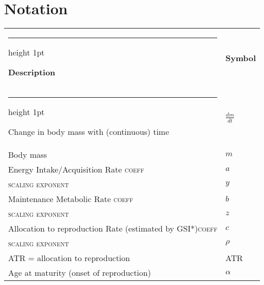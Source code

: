 \documentclass[a4paper]{article} %
\makeatletter
\newcommand{\thickhline}{%
    \noalign {\ifnum 0=`}\fi \hrule height 1pt
    \futurelet \reserved@a \@xhline
}
\makeatother
\begin{document}
\newpage\tableofcontents\thispagestyle{plain}

\newpage\listoffigures\thispagestyle{plain}


\newpage\section*{Notation}\thispagestyle{plain}

\begin{table}[h]
    \centering
    \begin{tabularx}{0.7\linewidth}{ll}
    \thickhline
    \textbf{Description}                                                & \textbf{Symbol}       \\ \thickhline
    Change in body mass with (continuous) time                          & $\frac{dm}{dt}$       \\
    Body mass                                                           & $m$                   \\ \hline
    Energy Intake/Acquisition Rate \textsc{coeff}                       & $a$                   \\ 
    \textsc{scaling exponent}                                           & $y$                   \\ \hline
    Maintenance Metabolic Rate \textsc{coeff}                           & $b$                   \\ 
    \textsc{scaling exponent}                                           & $z$                   \\ \hline
    Allocation to reproduction Rate (estimated by GSI*)\textsc{coeff}   & $c$                   \\  %
    \textsc{scaling exponent}                                           & $\rho$                \\ \hline %
    ATR = allocation to reproduction                                    & ATR                   \\ \hline
    Age at maturity (onset of reproduction)                             & $\alpha$              \\ \hline

\end{tabularx}
\end{table}
\end{document}
